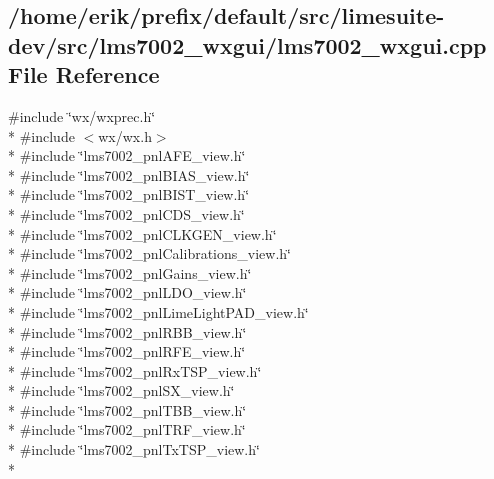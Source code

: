 \subsection{/home/erik/prefix/default/src/limesuite-\/dev/src/lms7002\+\_\+wxgui/lms7002\+\_\+wxgui.cpp File Reference}
\label{lms7002__wxgui_8cpp}
{\ttfamily \#include \char`\"{}wx/wxprec.\+h\char`\"{}}\\*
{\ttfamily \#include $<$wx/wx.\+h$>$}\\*
{\ttfamily \#include \char`\"{}lms7002\+\_\+pnl\+A\+F\+E\+\_\+view.\+h\char`\"{}}\\*
{\ttfamily \#include \char`\"{}lms7002\+\_\+pnl\+B\+I\+A\+S\+\_\+view.\+h\char`\"{}}\\*
{\ttfamily \#include \char`\"{}lms7002\+\_\+pnl\+B\+I\+S\+T\+\_\+view.\+h\char`\"{}}\\*
{\ttfamily \#include \char`\"{}lms7002\+\_\+pnl\+C\+D\+S\+\_\+view.\+h\char`\"{}}\\*
{\ttfamily \#include \char`\"{}lms7002\+\_\+pnl\+C\+L\+K\+G\+E\+N\+\_\+view.\+h\char`\"{}}\\*
{\ttfamily \#include \char`\"{}lms7002\+\_\+pnl\+Calibrations\+\_\+view.\+h\char`\"{}}\\*
{\ttfamily \#include \char`\"{}lms7002\+\_\+pnl\+Gains\+\_\+view.\+h\char`\"{}}\\*
{\ttfamily \#include \char`\"{}lms7002\+\_\+pnl\+L\+D\+O\+\_\+view.\+h\char`\"{}}\\*
{\ttfamily \#include \char`\"{}lms7002\+\_\+pnl\+Lime\+Light\+P\+A\+D\+\_\+view.\+h\char`\"{}}\\*
{\ttfamily \#include \char`\"{}lms7002\+\_\+pnl\+R\+B\+B\+\_\+view.\+h\char`\"{}}\\*
{\ttfamily \#include \char`\"{}lms7002\+\_\+pnl\+R\+F\+E\+\_\+view.\+h\char`\"{}}\\*
{\ttfamily \#include \char`\"{}lms7002\+\_\+pnl\+Rx\+T\+S\+P\+\_\+view.\+h\char`\"{}}\\*
{\ttfamily \#include \char`\"{}lms7002\+\_\+pnl\+S\+X\+\_\+view.\+h\char`\"{}}\\*
{\ttfamily \#include \char`\"{}lms7002\+\_\+pnl\+T\+B\+B\+\_\+view.\+h\char`\"{}}\\*
{\ttfamily \#include \char`\"{}lms7002\+\_\+pnl\+T\+R\+F\+\_\+view.\+h\char`\"{}}\\*
{\ttfamily \#include \char`\"{}lms7002\+\_\+pnl\+Tx\+T\+S\+P\+\_\+view.\+h\char`\"{}}\\*
